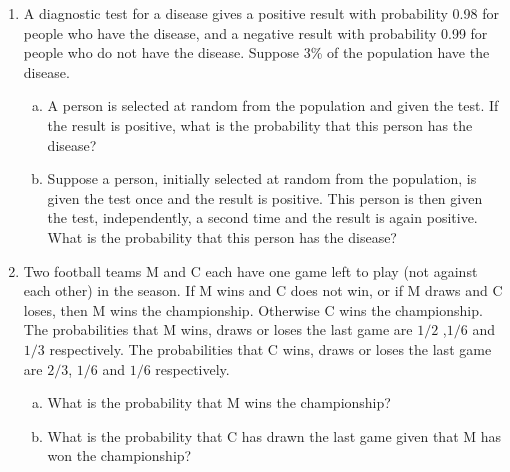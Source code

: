 \documentclass[a4paper,12pt]{article}
\begin{document}
\begin{enumerate}
\begin{enumerate}
\end{enumerate}


\item A diagnostic test for a disease gives a positive result with probability 0.98 for
people who have the disease, and a negative result with probability 0.99 for
people who do not have the disease. Suppose 3\% of the population have the
disease.
\begin{enumerate}[(a)]
\item A person is selected at random from the population and given the test.
If the result is positive, what is the probability that this person has the
disease?
\item Suppose a person, initially selected at random from the population, is
given the test once and the result is positive. This person is then given
the test, independently, a second time and the result is again positive.
What is the probability that this person has the disease?
\end{enumerate}
\item Two football teams M and C each have one game left to play (not against each
other) in the season. If M wins and C does not win, or if M draws and C loses,
then M wins the championship. Otherwise C wins the championship. The
probabilities that M wins, draws or loses the last game are $1/2$ ,$1/6$  and $1/3$ 
respectively. The probabilities that C wins, draws or loses the last game are $2/3$, $1/6$ and $1/6$ respectively.
\begin{enumerate}[(a)]
\item  What is the probability that M wins the championship?
\item  What is the probability that C has drawn the last game given that M has
won the championship?
\end{enumerate}


\end{enumerate}
\end{document}
